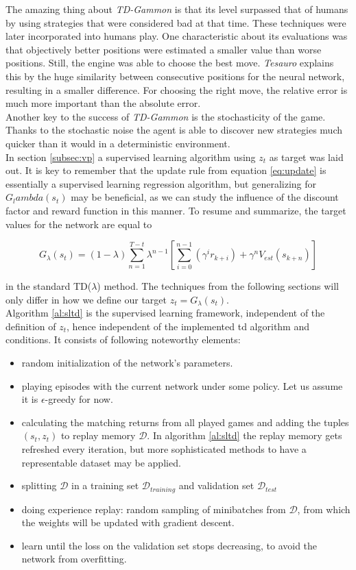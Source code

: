 The amazing thing about \textit{TD-Gammon} is that its level surpassed that of humans by using strategies that were considered bad at that time. These techniques were later incorporated into humans play. One characteristic about its evaluations was that objectively better positions were estimated a smaller value than worse positions. Still, the engine was able to choose the best move. \textit{Tesauro} explains this by the huge similarity between consecutive positions for the neural network, resulting in a smaller difference. For choosing the right move, the relative error is much more important than the absolute error.\\
Another key to the success of \textit{TD-Gammon} is the stochasticity of the game. Thanks to the stochastic noise the agent is able to discover new strategies much quicker than it would in a deterministic environment.\\

In section \ref{subsec:vp} a supervised learning algorithm using $z_t$ as target was laid out. It is key to remember that the update rule from equation \ref{eq:update} is essentially a supervised learning regression algorithm, but generalizing for $G_lambda(s_t)$ may be beneficial, as we can study the influence of the discount factor and reward function in this manner. To resume and summarize, the target values for the network are equal to

\begin{equation}
G_\lambda(s_t) = (1-\lambda) \sum_{n=1}^{T-t} \lambda^{n-1} \left[\sum_{i=0}^{n-1} \left( \gamma^i r_{k+i}\right) + \gamma^n V_{est}(s_{k+n}) \right]
\end{equation}

in the standard TD($\lambda$) method. The techniques from the following sections will only differ in how we define our target $z_t=G_\lambda(s_t)$.\\
Algorithm \ref{al:sltd} is the supervised learning framework, independent of the definition of $z_t$, hence independent of the implemented \gls{td} algorithm and conditions. It consists of following noteworthy elements:
\begin{itemize}
\item random initialization of the network's parameters.
\item playing episodes with the current network under some policy. Let us assume it is $\epsilon$-greedy for now.
\item calculating the matching returns from all played games and adding the tuples $(s_t,z_t)$ to replay memory $\mathcal{D}$. In algorithm \ref{al:sltd} the replay memory gets refreshed every iteration, but more sophisticated methods to have a representable dataset may be applied.
\item splitting $\mathcal{D}$ in a training set $\mathcal{D}_{training}$ and validation set $\mathcal{D}_{test}$
\item doing experience replay: random sampling of minibatches from $\mathcal{D}$, from which the weights will be updated with gradient descent.
\item learn until the loss on the validation set stops decreasing, to avoid the network from overfitting.
\end{itemize}

